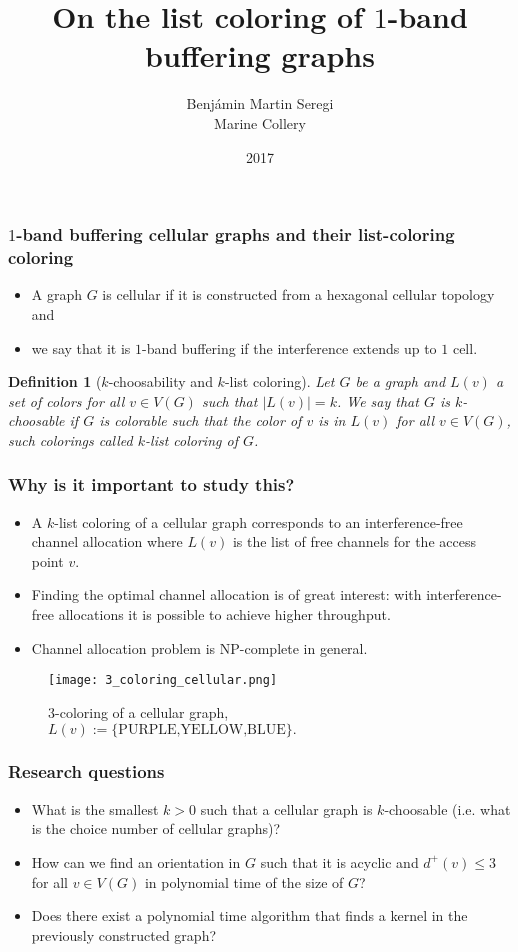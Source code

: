 \documentclass{beamer} %
\title{On the list coloring of $1$-band buffering graphs}
\author{Benjámin Martin Seregi\\Marine Collery}
\institute{
      \\[\medskipamount]
      KTH Royal Institute of Technology \\ II2202, Fall 2017, Period 1-2
}
\date{2017}
\newtheorem{defi}[lem]{Definition}
\begin{document}
\frame{\titlepage}

\begin{frame}
\frametitle{$1$-band buffering cellular graphs and their list-coloring coloring}
\justifying
\begin{itemize}
\item A graph $G$ is cellular if it is constructed from a hexagonal cellular topology and
\pause \item we say that it is $1$-band buffering if the interference extends up to $1$ cell.
\end{itemize}
\pause \begin{defi}[$k$-choosability and $k$-list coloring]
Let $G$ be a graph and $L(v)$ a set of colors for all $v \in V(G)$ such that $|L(v)|=k$. We say that $G$ is $k$\textit{-choosable} if $G$ is colorable such that the color of $v$ is in $L(v)$ for all $v \in V(G)$, such colorings called $k$\textit{-list coloring} of $G$.
\end{defi}
\end{frame}

\begin{frame}
\frametitle{Why is it important to study this?}
\justifying
\begin{itemize}
\item A $k$-list coloring of a cellular graph corresponds to an interference-free channel allocation where $L(v)$ is the list of free channels for the access point $v$.
\pause \item Finding the optimal channel allocation is of great interest: with interference-free allocations it is possible to achieve higher throughput.
\pause \item Channel allocation problem is $\mathrm{NP}$-complete in general.
\end{itemize}
\begin{figure}
\caption{3-coloring of a cellular graph, $L(v):=\lbrace \text{PURPLE,YELLOW,BLUE} \rbrace.$}
\texttt{[image: 3\_coloring\_cellular.png]}
\end{figure}
\end{frame}

\begin{frame}
\frametitle{Research questions}
\justifying
\begin{itemize}
\item What is the smallest $k > 0$ such that a cellular graph is $k$-choosable (i.e. what is the choice number of cellular graphs)?
\pause \item How can we find an orientation in $G$ such that it is acyclic and $d^+(v) \leqslant 3$ for all $v \in V(G)$ in polynomial time of the size of $G$?
\pause \item Does there exist a polynomial time algorithm that finds a kernel in the previously constructed graph?

\end{itemize}
\end{frame}
\end{document}
